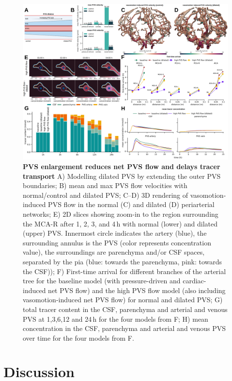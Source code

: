 \documentclass[fleqn,10pt]{wlscirep}
\begin{document}
\begin{figure}
    \centering
    \includegraphics[width=1 \textwidth]{figures/figure5.png}
    \caption{\textbf{PVS enlargement reduces net PVS flow and delays tracer transport}
    A) Modelling dilated PVS by extending the outer PVS boundaries;
    B) mean and max PVS flow velocities with normal/control and dilated PVS;
    C--D) 3D rendering of vasomotion-induced PVS flow in the normal (C) and dilated (D) periarterial networks; 
    E) 2D slices showing zoom-in to the region surrounding the MCA-R after 1, 2, 3, and 4\,h with normal (lower) and dilated (upper) PVS. Innermost circle indicates the artery (blue), the surrounding annulus is the PVS (color represents concentration value), the surroundings are parenchyma and/or CSF spaces, separated by the pia (blue: towards the parenchyma, pink: towards the CSF)); 
    F) First-time arrival for different branches of the arterial tree for the baseline model (with pressure-driven and cardiac-induced net PVS flow) and the high PVS flow model (also including vasomotion-induced net PVS flow) for normal and dilated PVS;
    G) total tracer content in the CSF, parenchyma and arterial and venous PVS at 1,3,6,12 and 24\,h for the four models from F;
    H) mean concentration in the CSF, parenchyma and arterial and venous PVS over time for the four models from F.
    }
    \label{fig:enlargement}
\end{figure}

\section*{Discussion}
\end{document}
